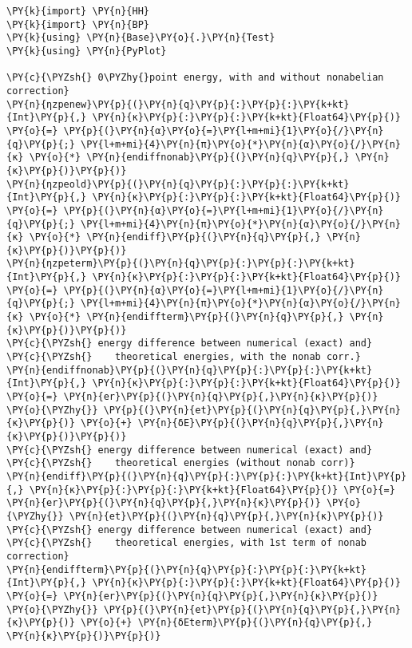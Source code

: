 \begin{Verbatim}[commandchars=\\\{\}]
\PY{k}{import} \PY{n}{HH}
\PY{k}{import} \PY{n}{BP}
\PY{k}{using} \PY{n}{Base}\PY{o}{.}\PY{n}{Test}
\PY{k}{using} \PY{n}{PyPlot}

\PY{c}{\PYZsh{} 0\PYZhy{}point energy, with and without nonabelian correction}
\PY{n}{ηzpenew}\PY{p}{(}\PY{n}{q}\PY{p}{:}\PY{p}{:}\PY{k+kt}{Int}\PY{p}{,} \PY{n}{κ}\PY{p}{:}\PY{p}{:}\PY{k+kt}{Float64}\PY{p}{)} \PY{o}{=} \PY{p}{(}\PY{n}{α}\PY{o}{=}\PY{l+m+mi}{1}\PY{o}{/}\PY{n}{q}\PY{p}{;} \PY{l+m+mi}{4}\PY{n}{π}\PY{o}{*}\PY{n}{α}\PY{o}{/}\PY{n}{κ} \PY{o}{*} \PY{n}{endiffnonab}\PY{p}{(}\PY{n}{q}\PY{p}{,} \PY{n}{κ}\PY{p}{)}\PY{p}{)}
\PY{n}{ηzpeold}\PY{p}{(}\PY{n}{q}\PY{p}{:}\PY{p}{:}\PY{k+kt}{Int}\PY{p}{,} \PY{n}{κ}\PY{p}{:}\PY{p}{:}\PY{k+kt}{Float64}\PY{p}{)} \PY{o}{=} \PY{p}{(}\PY{n}{α}\PY{o}{=}\PY{l+m+mi}{1}\PY{o}{/}\PY{n}{q}\PY{p}{;} \PY{l+m+mi}{4}\PY{n}{π}\PY{o}{*}\PY{n}{α}\PY{o}{/}\PY{n}{κ} \PY{o}{*} \PY{n}{endiff}\PY{p}{(}\PY{n}{q}\PY{p}{,} \PY{n}{κ}\PY{p}{)}\PY{p}{)}
\PY{n}{ηzpeterm}\PY{p}{(}\PY{n}{q}\PY{p}{:}\PY{p}{:}\PY{k+kt}{Int}\PY{p}{,} \PY{n}{κ}\PY{p}{:}\PY{p}{:}\PY{k+kt}{Float64}\PY{p}{)} \PY{o}{=} \PY{p}{(}\PY{n}{α}\PY{o}{=}\PY{l+m+mi}{1}\PY{o}{/}\PY{n}{q}\PY{p}{;} \PY{l+m+mi}{4}\PY{n}{π}\PY{o}{*}\PY{n}{α}\PY{o}{/}\PY{n}{κ} \PY{o}{*} \PY{n}{endiffterm}\PY{p}{(}\PY{n}{q}\PY{p}{,} \PY{n}{κ}\PY{p}{)}\PY{p}{)}
\PY{c}{\PYZsh{} energy difference between numerical (exact) and}
\PY{c}{\PYZsh{}    theoretical energies, with the nonab corr.}
\PY{n}{endiffnonab}\PY{p}{(}\PY{n}{q}\PY{p}{:}\PY{p}{:}\PY{k+kt}{Int}\PY{p}{,} \PY{n}{κ}\PY{p}{:}\PY{p}{:}\PY{k+kt}{Float64}\PY{p}{)} \PY{o}{=} \PY{n}{er}\PY{p}{(}\PY{n}{q}\PY{p}{,}\PY{n}{κ}\PY{p}{)} \PY{o}{\PYZhy{}} \PY{p}{(}\PY{n}{et}\PY{p}{(}\PY{n}{q}\PY{p}{,}\PY{n}{κ}\PY{p}{)} \PY{o}{+} \PY{n}{δE}\PY{p}{(}\PY{n}{q}\PY{p}{,}\PY{n}{κ}\PY{p}{)}\PY{p}{)}
\PY{c}{\PYZsh{} energy difference between numerical (exact) and}
\PY{c}{\PYZsh{}    theoretical energies (without nonab corr)}
\PY{n}{endiff}\PY{p}{(}\PY{n}{q}\PY{p}{:}\PY{p}{:}\PY{k+kt}{Int}\PY{p}{,} \PY{n}{κ}\PY{p}{:}\PY{p}{:}\PY{k+kt}{Float64}\PY{p}{)} \PY{o}{=}  \PY{n}{er}\PY{p}{(}\PY{n}{q}\PY{p}{,}\PY{n}{κ}\PY{p}{)} \PY{o}{\PYZhy{}} \PY{n}{et}\PY{p}{(}\PY{n}{q}\PY{p}{,}\PY{n}{κ}\PY{p}{)}
\PY{c}{\PYZsh{} energy difference between numerical (exact) and}
\PY{c}{\PYZsh{}    theoretical energies, with 1st term of nonab correction}
\PY{n}{endiffterm}\PY{p}{(}\PY{n}{q}\PY{p}{:}\PY{p}{:}\PY{k+kt}{Int}\PY{p}{,} \PY{n}{κ}\PY{p}{:}\PY{p}{:}\PY{k+kt}{Float64}\PY{p}{)} \PY{o}{=} \PY{n}{er}\PY{p}{(}\PY{n}{q}\PY{p}{,}\PY{n}{κ}\PY{p}{)} \PY{o}{\PYZhy{}} \PY{p}{(}\PY{n}{et}\PY{p}{(}\PY{n}{q}\PY{p}{,}\PY{n}{κ}\PY{p}{)} \PY{o}{+} \PY{n}{δEterm}\PY{p}{(}\PY{n}{q}\PY{p}{,} \PY{n}{κ}\PY{p}{)}\PY{p}{)}

\end{Verbatim}
